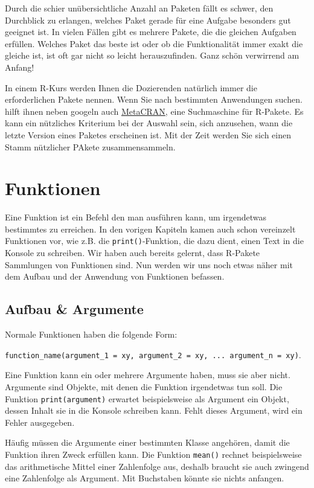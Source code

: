 \documentclass[
]{book}
\begin{document}
Durch die schier unübersichtliche Anzahl an Paketen fällt es schwer, den Durchblick zu erlangen, welches Paket gerade für eine Aufgabe besonders gut geeignet ist. In vielen Fällen gibt es mehrere Pakete, die die gleichen Aufgaben erfüllen. Welches Paket das beste ist oder ob die Funktionalität immer exakt die gleiche ist, ist oft gar nicht so leicht herauszufinden. Ganz schön verwirrend am Anfang!

In einem R-Kurs werden Ihnen die Dozierenden natürlich immer die erforderlichen Pakete nennen. Wenn Sie nach bestimmten Anwendungen suchen. hilft ihnen neben googeln auch \href{https://www.r-pkg.org/}{MetaCRAN}, eine Suchmaschine für R-Pakete. Es kann ein nützliches Kriterium bei der Auswahl sein, sich anzusehen, wann die letzte Version eines Paketes erscheinen ist. Mit der Zeit werden Sie sich einen Stamm nützlicher PAkete zusammensammeln.

\hypertarget{funktionen}{%
\section{Funktionen}\label{funktionen}}

Eine Funktion ist ein Befehl den man ausführen kann, um irgendetwas bestimmtes zu erreichen. In den vorigen Kapiteln kamen auch schon vereinzelt Funktionen vor, wie z.B. die \texttt{print()}-Funktion, die dazu dient, einen Text in die Konsole zu schreiben. Wir haben auch bereits gelernt, dass R-Pakete Sammlungen von Funktionen sind. Nun werden wir uns noch etwas näher mit dem Aufbau und der Anwendung von Funktionen befassen.

\hypertarget{aufbau-argumente}{%
\subsection{Aufbau \& Argumente}\label{aufbau-argumente}}

Normale Funktionen haben die folgende Form:

\texttt{function\_name(argument\_1\ =\ xy,\ argument\_2\ =\ xy,\ ...\ argument\_n\ =\ xy)}.

Eine Funktion kann ein oder mehrere Argumente haben, muss sie aber nicht. Argumente sind Objekte, mit denen die Funktion irgendetwas tun soll. Die Funktion \texttt{print(argument)} erwartet beispielsweise als Argument ein Objekt, dessen Inhalt sie in die Konsole schreiben kann. Fehlt dieses Argument, wird ein Fehler ausgegeben.

Häufig müssen die Argumente einer bestimmten Klasse angehören, damit die Funktion ihren Zweck erfüllen kann. Die Funktion \texttt{mean()} rechnet beispielsweise das arithmetische Mittel einer Zahlenfolge aus, deshalb braucht sie auch zwingend eine Zahlenfolge als Argument. Mit Buchstaben könnte sie nichts anfangen.
\end{document}
